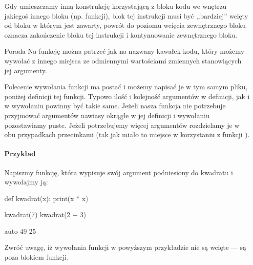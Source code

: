 \documentclass{pdfBooklets}
\begin{document}
Gdy umieszczamy inną konstrukcję korzystającą z bloku kodu we wnętrzu jakiegoś innego bloku (np. funkcji), blok tej instrukcji musi być ,,bardziej'' wcięty od bloku w którym jest zawarty,
powrót do poziomu wcięcia zewnętrznego bloku oznacza zakończenie bloku tej instrukcji i kontynuowanie zewnętrznego bloku.

\begin{ProTip}{Porada}
Na funkcję można patrzeć jak na nazwany kawałek kodu, który możemy wywołać z innego miejsca ze odmiennymi wartościami zmiennych stanowiących jej argumenty.
\end{ProTip}

Polecenie wywołania funkcji ma postać  i możemy napisać je w tym samym pliku, poniżej definicji tej funkcji.
Typowo ilość i kolejność argumentów w definicji, jak i w wywołaniu powinny być takie same.
Jeżeli nasza funkcja nie potrzebuje przyjmować argumentów nawiasy okrągłe w jej definicji i wywołaniu pozostawiamy puste.
Jeżeli potrzebujemy więcej argumentów rozdzielamy je w obu przypadkach przecinkami (tak jak miało to miejsce w korzystaniu z funkcji ).

\paragraph{Przykład}
Napiszmy funkcję, która wypisuje swój argument podniesiony do kwadratu i wywołajmy ją:

\begin{CodeFrame}[python]{.5\textwidth}
def kwadrat(x):
  print(x * x)

kwadrat(7)
kwadrat(2 + 3)
\end{CodeFrame}
\begin{CodeFrame}{auto}
49
25
\end{CodeFrame}

\noindent
Zwróć uwagę, iż wywołania funkcji w powyższym przykładzie nie są wcięte --- są poza blokiem funkcji.

\end{document}
